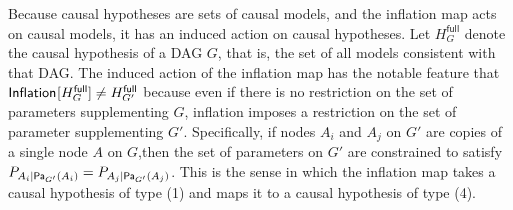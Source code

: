 

Because causal hypotheses are sets of causal models, and the inflation map acts on causal models, it has an induced action on causal hypotheses.   Let $H_G^{\textsf{full}}$ denote the causal hypothesis of a DAG $G$, that is, the set of all models consistent with that DAG.  The induced action of the inflation map has the notable feature that $\SmallNamedFunction{Inflation}{H_G^{\textsf{full}}} \ne H_{G'}^{\textsf{full}}$ because even if there is no restriction on the set of parameters supplementing $G$, inflation imposes a restriction on the set of parameter supplementing $G'$.  Specifically,   if nodes $A_i$ and $A_j$ on $G'$ are copies of a single node $A$ on $G$,then the set of parameters on $G'$ are constrained to satisfy $\pfunc{A_i| \Pa[G']{A_i}}=\pfunc{A_j|\Pa[G']{A_j}}$.  This is the sense in which the inflation map takes a causal hypothesis of type (1) and maps it to a causal hypothesis of type (4).



